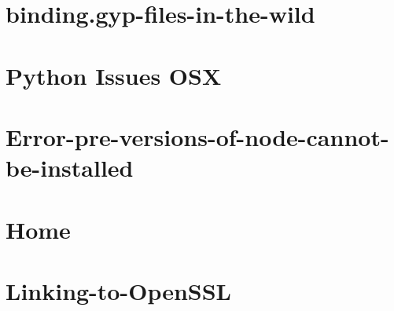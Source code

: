 \documentclass[twoside]{book}
\newcommand{\+}{\discretionary{\mbox{\scriptsize$\hookleftarrow$}}{}{}}
\begin{document}
\chapter{binding.\+gyp-\/files-\/in-\/the-\/wild}
\label{md__c___users_vaishnavi_jadhav__desktop__developer_code_mean_stack_example_client_node_modules_nf2f0b7ebc8ff5cdf371b3a00a1fe7bfb}

\chapter{Python Issues OSX}
\label{md__c___users_vaishnavi_jadhav__desktop__developer_code_mean_stack_example_client_node_modules_node_gyp_docs__common_issues}

\chapter{Error-\/pre-\/versions-\/of-\/node-\/cannot-\/be-\/installed}
\label{md__c___users_vaishnavi_jadhav__desktop__developer_code_mean_stack_example_client_node_modules_nfb5ae8bacd9e99954d6d99716d1b30d0}

\chapter{Home}
\label{md__c___users_vaishnavi_jadhav__desktop__developer_code_mean_stack_example_client_node_modules_node_gyp_docs__home}

\chapter{Linking-\/to-\/\+Open\+SSL}
\label{md__c___users_vaishnavi_jadhav__desktop__developer_code_mean_stack_example_client_node_modules_na2e1619071859241a103217558022748}

\end{document}
